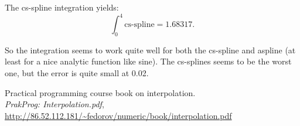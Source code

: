 \documentclass{article}
\begin{document}
The cs-spline integration  yields:
\begin{equation}
\int_0^4 \text{cs-spline} = 1.68317. 
\end{equation}

So the integration seems to work quite well for both the cs-spline and aspline (at least for a nice analytic function like sine).
The cs-splines seems to be the worst one, but the error is quite small at 0.02.
\clearpage
\begin{thebibliography}{99}
  Practical programming course book on interpolation.\\
  \emph{PrakProg: Interpolation.pdf},\\
 \url{http://86.52.112.181/~fedorov/numeric/book/interpolation.pdf}\\

\end{thebibliography}
\end{document}
